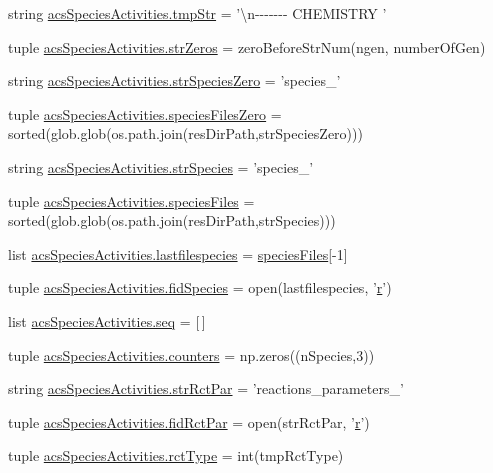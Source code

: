 \begin{DoxyCompactItemize}
\item 
string \hyperlink{a00129_a81ab8133517c53adfcdf8129e24cf5d0}{acs\-Species\-Activities.\-tmp\-Str} = '\textbackslash{}n-\/-\/-\/-\/-\/-\/-\/ C\-H\-E\-M\-I\-S\-T\-R\-Y '
\item 
tuple \hyperlink{a00129_ac53f52471f3cf1ef18465a07dc930dff}{acs\-Species\-Activities.\-str\-Zeros} = zero\-Before\-Str\-Num(ngen, number\-Of\-Gen)
\item 
string \hyperlink{a00129_a78927c369e0fe9deb29777c699af346f}{acs\-Species\-Activities.\-str\-Species\-Zero} = 'species\-\_\-'
\item 
tuple \hyperlink{a00129_a2f73b228eca2d5d0e45f781ccc21b253}{acs\-Species\-Activities.\-species\-Files\-Zero} = sorted(glob.\-glob(os.\-path.\-join(res\-Dir\-Path,str\-Species\-Zero)))
\item 
string \hyperlink{a00129_a7ad6c119fecb41b02823a95f334daa4c}{acs\-Species\-Activities.\-str\-Species} = 'species\-\_\-'
\item 
tuple \hyperlink{a00129_a7e3b3a6b0c9305e60758bf5d44e7b0f6}{acs\-Species\-Activities.\-species\-Files} = sorted(glob.\-glob(os.\-path.\-join(res\-Dir\-Path,str\-Species)))
\item 
list \hyperlink{a00129_ac7070acb2aaeb8965c57e81b6308ddd5}{acs\-Species\-Activities.\-lastfilespecies} = \hyperlink{a00028_af5703745c2c2a6af7f62da460994d9c2}{species\-Files}\mbox{[}-\/1\mbox{]}
\item 
tuple \hyperlink{a00129_a240d5b3cd72043528f4b674a8ba00a33}{acs\-Species\-Activities.\-fid\-Species} = open(lastfilespecies, '\hyperlink{a00031_ac862e7284527eb913b1351c8bfb8e079}{r}')
\item 
list \hyperlink{a00129_a50a8f7f4bae0fd037961d91206f5178c}{acs\-Species\-Activities.\-seq} = \mbox{[}$\,$\mbox{]}
\item 
tuple \hyperlink{a00129_a6afffdd046bbc3bc4fbee34b561fcae5}{acs\-Species\-Activities.\-counters} = np.\-zeros((n\-Species,3))
\item 
string \hyperlink{a00129_ab59af27efe5462ef13ae45fd7330d0b3}{acs\-Species\-Activities.\-str\-Rct\-Par} = 'reactions\-\_\-parameters\-\_\-'
\item 
tuple \hyperlink{a00129_a64247b23c199d0b0d0d60f02ec8682e3}{acs\-Species\-Activities.\-fid\-Rct\-Par} = open(str\-Rct\-Par, '\hyperlink{a00031_ac862e7284527eb913b1351c8bfb8e079}{r}')
\item 
tuple \hyperlink{a00129_abdc37f53b75138949fbbe9f9e42f1e6f}{acs\-Species\-Activities.\-rct\-Type} = int(tmp\-Rct\-Type)
\item 

\end{DoxyCompactItemize}

